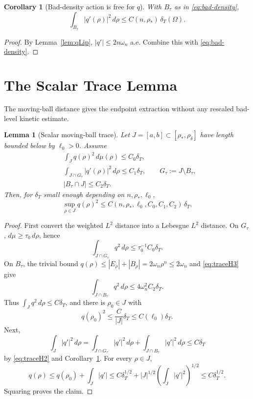 \documentclass[11pt]{article}
\newtheorem{lemma}[theorem]{Lemma}
\newtheorem{corollary}[theorem]{Corollary}
\theoremstyle{definition}
\newcommand{\dT}{\delta_T}
\newcommand{\rstar}{\rho_*}
\newcommand{\rdel}{\rho_\delta}
\newcommand{\muT}{\mu}
\begin{document}
\begin{corollary}[Bad-density action is free for \(q\)]\label{cor:badtau}
With \(B_\tau\) as in \eqref{eq:bad-density},
\[
   \int_{B_\tau}|q'(\rho)|^2\,d\rho
   \le C(n,\rstar)\,\dT(\Omega).
\]
\end{corollary}

\begin{proof}
By Lemma~\ref{lem:qLip}, \(|q'|\le 2n\omega_n\) a.e.  Combine this with
\eqref{eq:bad-density}.
\end{proof}

\section{The Scalar Trace Lemma}

The moving-ball distance gives the endpoint extraction without any rescaled
bad-level kinetic estimate.

\begin{lemma}[Scalar moving-ball trace]\label{lem:scalartrace}
Let \(J=[a,b]\subset[\rstar,\rdel]\) have length bounded below by
\(\ell_0>0\).  Assume
\begin{align}
   &\int_J q(\rho)^2\,d\muT(\rho)\le C_0\dT, \label{eq:traceH1}\\
   &\int_{J\cap G_\tau}|q'(\rho)|^2\,d\rho\le C_1\dT, \qquad
     G_\tau:=J\setminus B_\tau, \label{eq:traceH2}\\
   &|B_\tau\cap J|\le C_2\dT . \label{eq:traceH3}
\end{align}
Then, for \(\dT\) small enough depending on \(n,\rstar,\ell_0\),
\[
   \sup_{\rho\in J}q(\rho)^2\le C(n,\rstar,\ell_0,C_0,C_1,C_2)\,\dT .
\]
\end{lemma}

\begin{proof}
First convert the weighted \(L^2\) distance into a Lebesgue \(L^2\) distance.
On \(G_\tau\), \(d\muT\ge\tau_0\,d\rho\), hence
\[
   \int_{J\cap G_\tau}q^2\,d\rho\le \tau_0^{-1}C_0\dT .
\]
On \(B_\tau\), the trivial bound \(q(\rho)\le |E_\rho|+|B_\rho|=2\omega_n\rho^n
\le2\omega_n\) and \eqref{eq:traceH3} give
\[
   \int_{J\cap B_\tau}q^2\,d\rho\le 4\omega_n^2 C_2\dT.
\]
Thus \(\int_J q^2\,d\rho\le C\dT\), and there is \(\rho_0\in J\) with
\[
   q(\rho_0)^2\le \frac{C}{|J|}\dT\le C(\ell_0)\dT.
\]
Next,
\[
   \int_J |q'|^2\,d\rho
   =
   \int_{J\cap G_\tau}|q'|^2\,d\rho+
   \int_{J\cap B_\tau}|q'|^2\,d\rho
   \le C\dT
\]
by \eqref{eq:traceH2} and Corollary~\ref{cor:badtau}.  For every
\(\rho\in J\),
\[
   q(\rho)
   \le q(\rho_0)+\int_J|q'|
   \le C\dT^{1/2}+|J|^{1/2}\left(\int_J|q'|^2\right)^{1/2}
   \le C\dT^{1/2}.
\]
Squaring proves the claim.
\end{proof}
\end{document}
